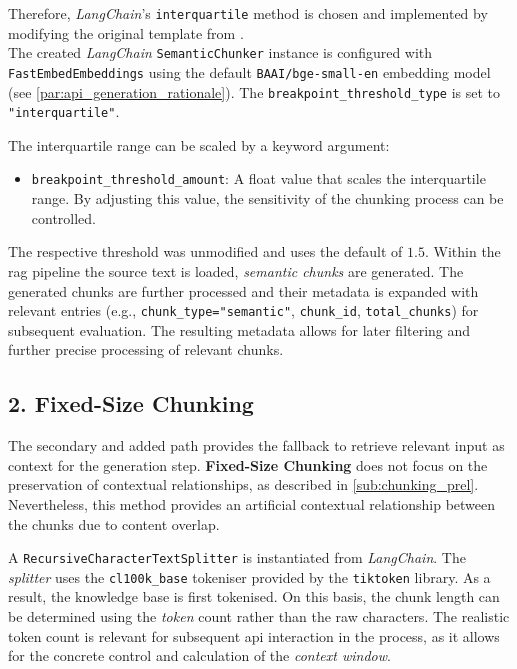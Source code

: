 Therefore, \textit{LangChain}'s \texttt{interquartile} method is chosen and implemented by modifying the original template from \cite{langchainsemantic}.\\
The created \textit{LangChain} \texttt{SemanticChunker} instance is configured with \texttt{FastEmbedEmbeddings} using the default \texttt{BAAI/bge-small-en} embedding model (see \cref{par:api_generation_rationale}).
The \texttt{breakpoint\_threshold\_type} is set to \texttt{"interquartile"}.

The interquartile range can be scaled by a keyword argument:
\begin{itemize}
    \item \texttt{breakpoint\_threshold\_amount}: A float value that scales the interquartile range.
    By adjusting this value, the sensitivity of the chunking process can be controlled.
\end{itemize}
The respective threshold was unmodified and uses the default of $1.5$.
%
Within the \ac{rag} pipeline the source text is loaded, \textit{semantic chunks} are generated.
The generated chunks are further processed and their metadata is expanded with relevant entries (e.g., \texttt{chunk\_type="semantic"}, \texttt{chunk\_id}, \texttt{total\_chunks}) for subsequent evaluation.
The resulting metadata allows for later filtering and further precise processing of relevant chunks.

\subsection*{2. Fixed-Size Chunking}\label{app:sub:fixed_size_chunking}
The secondary and added path provides the fallback to retrieve relevant input as context for the generation step.
%
\textbf{Fixed-Size Chunking} does not focus on the preservation of contextual relationships, as described in \cref{sub:chunking_prel}.
Nevertheless, this method provides an artificial contextual relationship between the chunks due to content overlap.

A \texttt{RecursiveCharacterTextSplitter} is instantiated from \textit{LangChain}.
The \textit{splitter} uses the \texttt{cl100k\_base} tokeniser provided by the \texttt{tiktoken} library.
As a result, the knowledge base is first tokenised.
On this basis, the chunk length can be determined using the \textit{token} count rather than the raw characters.
The realistic token count is relevant for subsequent \ac{api} interaction in the process, as it allows for the concrete control and calculation of the \textit{context window}.

